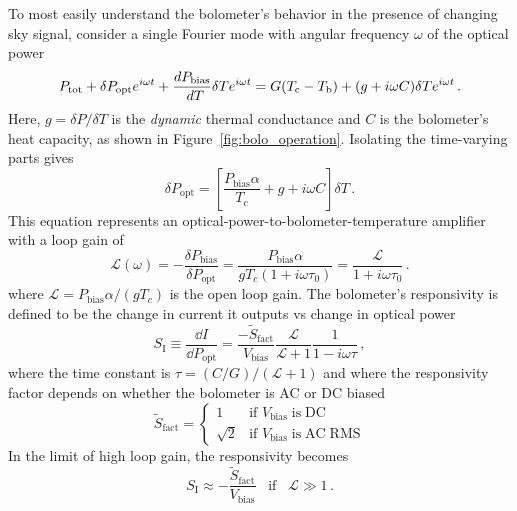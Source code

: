 To most easily understand the bolometer's behavior in the presence of changing sky signal, consider a single Fourier mode with angular frequency $\omega$ of the optical power
\begin{equation}
    P_{\mathrm{tot}} + \delta P_{\mathrm{opt}}e^{i \omega t} + \frac{\\d P_{\mathrm{bias}}}{\\d T} \delta T e^{i \omega t} = G (T_{\mathrm{c}} - T_{\mathrm{b}}) + (g + i \omega C) \delta T e^{i \omega t} \, .
    \label{eq:changing_bolometer_power}
\end{equation}
Here, $g = \delta P / \delta T$ is the \textit{dynamic} thermal conductance and $C$ is the bolometer's heat capacity, as shown in Figure~\ref{fig:bolo_operation}. Isolating the time-varying parts gives
\begin{equation}
    \delta P_{\mathrm{opt}} = \left[ \frac{P_{\mathrm{bias}} \alpha}{T_{c}} + g + i \omega C \right] \delta T \, .
    \label{eq:time_varying_optical_power}
\end{equation}
This equation represents an optical-power-to-bolometer-temperature amplifier with a loop gain of
\begin{equation}
    \mathcal{L}(\omega) = - \frac{\delta P_{\mathrm{bias}}}{\delta P_{\mathrm{opt}}} = \frac{P_{\mathrm{bias}} \alpha}{g T_{c} (1 + i \omega \tau_0)}  = \frac{\mathcal{L}}{1 + i \omega \tau_{0}} \, .
\end{equation}
where $\mathcal{L} = P_{\mathrm{bias}} \alpha / (g T_{c})$ is the open loop gain. The bolometer's responsivity is defined to be the change in current it outputs vs change in optical power
\begin{equation}
    S_{\mathrm{I}} \equiv \frac{\dd I}{\dd P_{\mathrm{opt}}} = \frac{-\tilde{S}_{\mathrm{fact}}}{V_{\mathrm{bias}}} \frac{\mathcal{L}}{\mathcal{L} + 1} \frac{1}{1 - i \omega \tau} \, ,
    \label{eq:bolometer_responsivity}
\end{equation}
where the time constant is $\tau = (C / G) / (\mathcal{L} + 1)$ and where the responsivity factor depends on whether the bolometer is AC or DC biased
\begin{equation}
    \tilde{S}_{\mathrm{fact}} = 
    \begin{cases}
        1        & \text{if } V_{\mathrm{bias}} \mathrm{\; is \; DC} \\
        \sqrt{2} & \text{if } V_{\mathrm{bias}} \mathrm{\; is \; AC \; RMS}
    \end{cases}
    \label{eq:readout_responsivity}
\end{equation}
In the limit of high loop gain, the responsivity becomes
\begin{equation}
    S_{\mathrm{I}} \approx - \frac{\tilde{S}_{\mathrm{fact}}}{V_{\mathrm{bias}}} \;\;\; \mathrm{if} \;\;\; \mathcal{L} \gg 1 \, .
    \label{eq:responsivity_high_loop_gain}
\end{equation}

